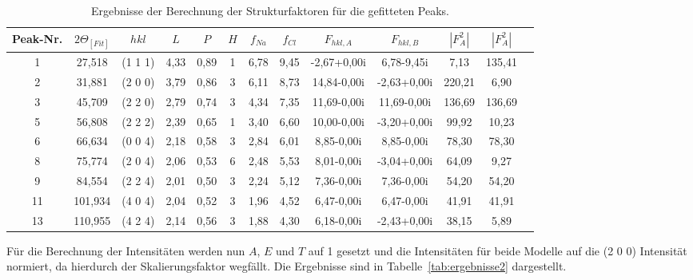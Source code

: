 \begin{table}[h!]
    \centering
    \begin{tabular}{|c|c|c|c|c|c|c|c|c|c|c|c|c|}
        \hline
       Peak-Nr. & $2\Theta_{[Fit]}$& $hkl$ & $L$ & $P$ & $H$ & $f_{Na}$ & $f_{Cl}$ & $F_{hkl, A}$& $F_{hkl, B}$ & $\left|F_A^2\right|$ & $\left|F_A^2\right|$ \\ [0,5ex]
       \hline\hline
       1 & 27,518 & (1 1 1)&4,33 & 0,89 & 1 & 6,78 & 9,45 & -2,67+0,00i & 6,78-9,45i & 7,13 & 135,41 \\
       2 & 31,881 &(2 0 0)& 3,79 & 0,86 & 3 & 6,11 & 8,73 & 14,84-0,00i & -2,63+0,00i & 220,21 & 6,90 \\
       3 & 45,709 &(2 2 0)& 2,79 & 0,74 & 3 & 4,34 & 7,35 & 11,69-0,00i & 11,69-0,00i & 136,69 & 136,69 \\
       5 & 56,808 &(2 2 2)& 2,39 & 0,65 & 1 & 3,40 & 6,60 & 10,00-0,00i & -3,20+0,00i & 99,92 & 10,23 \\
       6 & 66,634 &(0 0 4)& 2,18 & 0,58 & 3 & 2,84 & 6,01 & 8,85-0,00i & 8,85-0,00i & 78,30 & 78,30 \\
       8 & 75,774 &(2 0 4)& 2,06 & 0,53 & 6 & 2,48 & 5,53 & 8,01-0,00i & -3,04+0,00i & 64,09 & 9,27 \\
       9 & 84,554 &(2 2 4)& 2,01 & 0,50 & 3 & 2,24 & 5,12 & 7,36-0,00i & 7,36-0,00i & 54,20 & 54,20 \\
       11 &101,934 &(4 0 4)& 2,04 & 0,52 & 3 & 1,96 & 4,52 & 6,47-0,00i & 6,47-0,00i & 41,91 & 41,91 \\
       13 & 110,955 &(4 2 4)& 2,14 & 0,56 & 3 & 1,88 & 4,30 & 6,18-0,00i & -2,43+0,00i & 38,15 & 5,89 \\ [1ex]
       \hline
       \end{tabular}    
   \caption[short]{Ergebnisse der Berechnung der Strukturfaktoren für die gefitteten Peaks.}
   \label{tab:ergebnisse}
\end{table}

Für die Berechnung der Intensitäten werden nun $A$, $E$ und $T$ auf 1 gesetzt und die Intensitäten für beide Modelle auf die (2 0 0) Intensität normiert, da hierdurch der Skalierungsfaktor wegfällt. Die Ergebnisse sind in Tabelle~\ref{tab:ergebnisse2} dargestellt.

